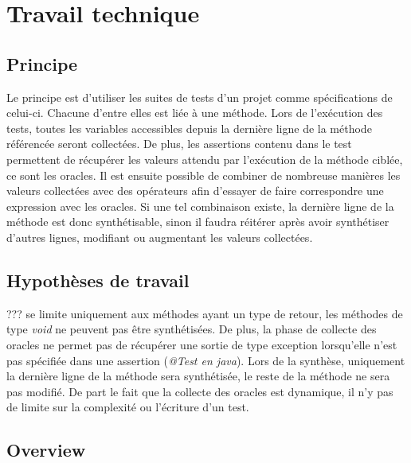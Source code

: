 

\chapter{Travail technique}
	\thispagestyle{document}
	
\section{Principe}
\label{sec:principe}

\par Le principe est d'utiliser les suites de tests d'un projet comme spécifications de celui-ci. Chacune d'entre elles est liée à une méthode. Lors de l'exécution des tests, toutes les variables accessibles depuis la dernière ligne de la méthode référencée seront collectées. De plus, les assertions contenu dans le test permettent de récupérer les valeurs attendu par l'exécution de la méthode ciblée, ce sont les oracles. Il est ensuite possible de combiner de nombreuse manières les valeurs collectées avec des opérateurs afin d'essayer de faire correspondre une expression avec les oracles. Si une tel combinaison existe, la dernière ligne de la méthode est donc synthétisable, sinon il faudra réitérer après avoir synthétiser d'autres lignes, modifiant ou augmentant les valeurs collectées.

\section{Hypothèses de travail}
\label{sec:hypotheses}


\par ??? se limite uniquement aux méthodes ayant un type de retour, les méthodes de type \textit{void} ne peuvent pas être synthétisées. De plus, la phase de collecte des oracles ne permet pas de récupérer une sortie de type exception lorsqu'elle n'est pas spécifiée dans une assertion (\textit{@Test en java}). Lors de la synthèse, uniquement la dernière ligne de la méthode sera synthétisée, le reste de la méthode ne sera pas modifié. De part le fait que la collecte des oracles est dynamique, il n'y pas de limite sur la complexité ou l'écriture d'un test.



\section{Overview}
\label{sec:overview}

